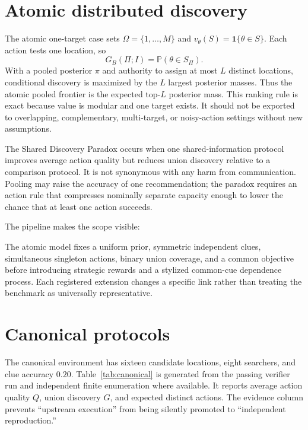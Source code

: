 \documentclass[11pt]{article}
\theoremstyle{remark}
\newcommand{\Prob}{\mathbb{P}}
\begin{document}
\section{Atomic distributed discovery}
The atomic one-target case sets $\Omega=\{1,\ldots,M\}$ and $v_\theta(S)=\mathbf 1\{\theta\in S\}$. Each action tests one location, so
\[
G_B(\Pi;I)=\Prob(\theta\in S_\Pi).
\]
With a pooled posterior $\pi$ and authority to assign at most $L$ distinct locations, conditional discovery is maximized by the $L$ largest posterior masses. Thus the atomic pooled frontier is the expected top-$L$ posterior mass. This ranking rule is exact because value is modular and one target exists. It should not be exported to overlapping, complementary, multi-target, or noisy-action settings without new assumptions.

The Shared Discovery Paradox occurs when one shared-information protocol improves average action quality but reduces union discovery relative to a comparison protocol. It is not synonymous with any harm from communication. Pooling may raise the accuracy of one recommendation; the paradox requires an action rule that compresses nominally separate capacity enough to lower the chance that at least one action succeeds.

The pipeline makes the scope visible:
\begin{center}
\end{center}
The atomic model fixes a uniform prior, symmetric independent clues, simultaneous singleton actions, binary union coverage, and a common objective before introducing strategic rewards and a stylized common-cue dependence process. Each registered extension changes a specific link rather than treating the benchmark as universally representative.

\section{Canonical protocols}
The canonical environment has sixteen candidate locations, eight searchers, and clue accuracy $0.20$. Table~\ref{tab:canonical} is generated from the passing verifier run and independent finite enumeration where available. It reports average action quality $Q$, union discovery $G$, and expected distinct actions. The evidence column prevents ``upstream execution'' from being silently promoted to ``independent reproduction.''
\end{document}
